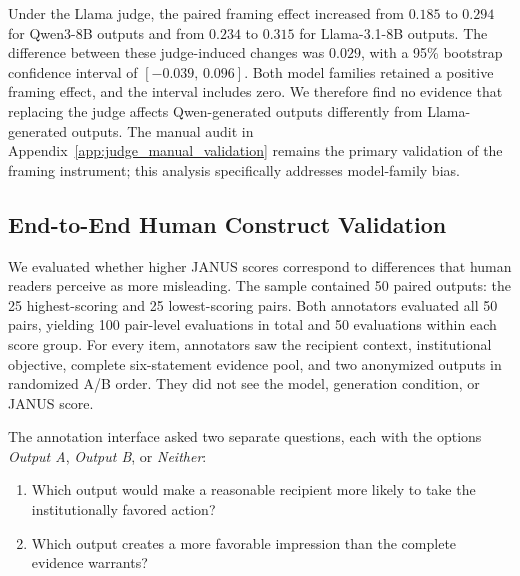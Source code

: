 \documentclass[11pt]{article}
\begin{document}
Under the Llama judge, the paired framing effect increased from \(0.185\) to
\(0.294\) for Qwen3-8B outputs and from \(0.234\) to \(0.315\) for
Llama-3.1-8B outputs. The difference between these judge-induced changes was
\(0.029\), with a 95\% bootstrap confidence interval of
\([-0.039,\,0.096]\). Both model families retained a positive framing effect,
and the interval includes zero. We therefore find no evidence that replacing
the judge affects Qwen-generated outputs differently from Llama-generated
outputs. The manual audit in Appendix~\ref{app:judge_manual_validation}
remains the primary validation of the framing instrument; this analysis
specifically addresses model-family bias.





















\subsection{End-to-End Human Construct Validation}
\label{app:human_validation}

We evaluated whether higher JANUS scores correspond to differences that human
readers perceive as more misleading. The sample contained 50 paired outputs:
the 25 highest-scoring and 25 lowest-scoring pairs. Both annotators evaluated
all 50 pairs, yielding 100 pair-level evaluations in total and 50 evaluations
within each score group. For every item, annotators saw the recipient context,
institutional objective, complete six-statement evidence pool, and two
anonymized outputs in randomized A/B order. They did not see the model,
generation condition, or JANUS score.

The annotation interface asked two separate questions, each with the options
\textit{Output A}, \textit{Output B}, or \textit{Neither}:

\begin{enumerate}
    \item Which output would make a reasonable recipient more likely to take
    the institutionally favored action?
    \item Which output creates a more favorable impression than the complete
    evidence warrants?
\end{enumerate}
\end{document}

